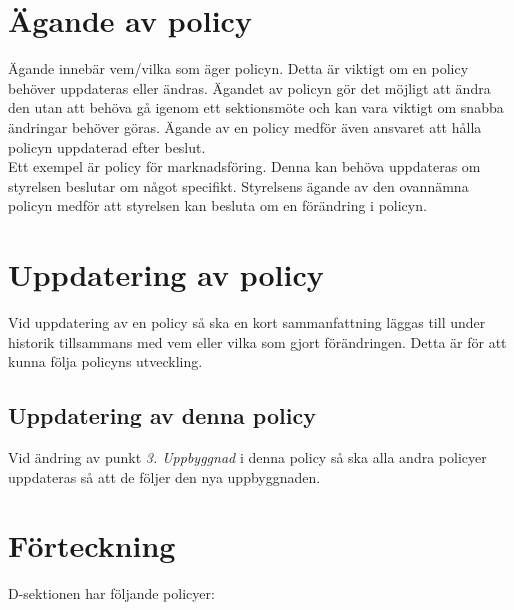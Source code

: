 \documentclass[]{dsekprotokoll}
\begin{document}
\prevdepth\tpd

\section{Ägande av policy}
Ägande innebär vem/vilka som äger policyn. Detta är viktigt om en policy behöver uppdateras eller ändras. Ägandet av policyn gör det möjligt att ändra den utan att behöva gå igenom ett sektionsmöte och kan vara viktigt om snabba ändringar behöver göras. Ägande av en policy medför även ansvaret att hålla policyn uppdaterad efter beslut.
\\

Ett exempel är policy för marknadsföring. Denna kan behöva uppdateras om styrelsen beslutar om något specifikt. Styrelsens ägande av den ovannämna policyn medför att styrelsen kan besluta om en förändring i policyn.

\section{Uppdatering av policy}
Vid uppdatering av en policy så ska en kort sammanfattning läggas till under historik tillsammans med vem eller vilka som gjort förändringen. Detta är för att kunna följa policyns utveckling.

\subsection{Uppdatering av denna policy}
Vid ändring av punkt \textit{3. Uppbyggnad} i denna policy så ska alla andra policyer uppdateras så att de följer den nya uppbyggnaden.

\section{Förteckning}

D-sektionen har följande policyer:
\end{document}
